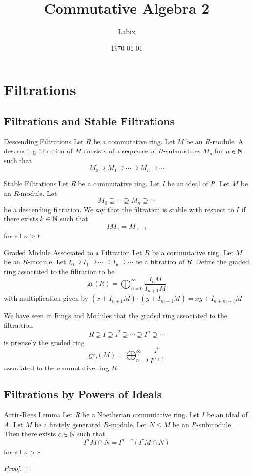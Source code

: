 \documentclass[a4paper]{article}
\title{Commutative Algebra 2}
\author{Labix}
\date{\today}
\begin{document}
\maketitle
\begin{abstract}
\end{abstract}
\pagebreak
\tableofcontents

\pagebreak
\section{Filtrations}
\subsection{Filtrations and Stable Filtrations}
\begin{defn}{Descending Filtrations}{} Let $R$ be a commutative ring. Let $M$ be an $R$-module. A descending filtration of $M$ consists of a sequence of $R$-submodules $M_n$ for $n\in\mathbb{N}$ such that $$M_0\supseteq M_1\supseteq\cdots\supseteq M_n\supseteq\cdots$$
\end{defn}

\begin{defn}{Stable Filtrations}{} Let $R$ be a commutative ring. Let $I$ be an ideal of $R$. Let $M$ be an $R$-module. Let $$M_0\supseteq\cdots\supseteq M_n\supseteq\cdots$$ be a descending filtration. We say that the filtration is stable with respect to $I$ if there exists $k\in\mathbb{N}$ such that $$IM_n=M_{n+1}$$ for all $n\geq k$. 
\end{defn}

\begin{defn}{Graded Module Associated to a Filtration}{} Let $R$ be a commutative ring. Let $M$ be an $R$-module. Let $I_0\supseteq I_1\supseteq\cdots\supseteq I_n\supseteq\cdots$ be a filtration of $R$. Define the graded ring associated to the filtration to be $$\text{gr}(R)=\bigoplus_{n=0}^\infty\frac{I_nM}{I_{n+1}M}$$ with multiplication given by $(x+I_{n+1}M)\cdot(y+I_{m+1}M)=xy+I_{n+m+1}M$
\end{defn}

We have seen in Rings and Modules that the graded ring associated to the filtrartion $$R\supseteq I\supseteq I^2\supseteq\cdots\supseteq I^n\supseteq\cdots$$ is precisely the graded ring $$\text{gr}_I(M)=\bigoplus_{n=0}^\infty\frac{I^n}{I^{n+1}}$$ associated to the commutative ring $R$. 

\subsection{Filtrations by Powers of Ideals}
\begin{thm}{Artin-Rees Lemma}{} Let $R$ be a Noetherian commutative ring. Let $I$ be an ideal of $A$. Let $M$ be a finitely generated $R$-module. Let $N\leq M$ be an $R$-submodule. Then there exists $c\in\mathbb{N}$ such that $$I^nM\cap N=I^{n-c}(I^cM\cap N)$$ for all $n>c$. \tcbline
\begin{proof}

\end{proof}
\end{thm}
\end{document}
